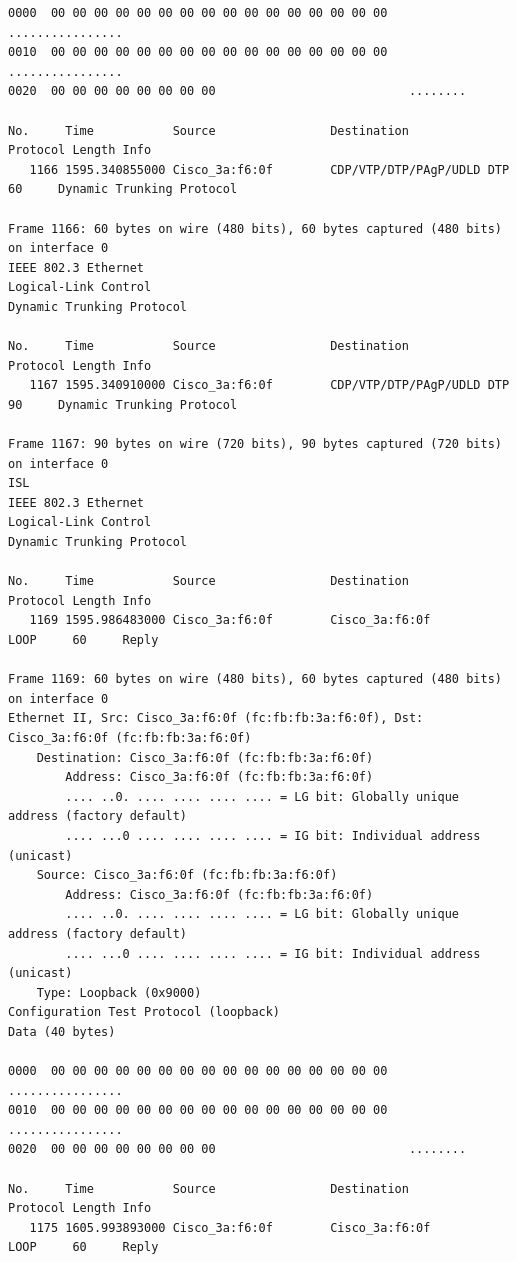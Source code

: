 \documentclass[a4paper,11pt]{article}
\begin{document}
\begin{lstlisting}
0000  00 00 00 00 00 00 00 00 00 00 00 00 00 00 00 00   ................
0010  00 00 00 00 00 00 00 00 00 00 00 00 00 00 00 00   ................
0020  00 00 00 00 00 00 00 00                           ........

No.     Time           Source                Destination           Protocol Length Info
   1166 1595.340855000 Cisco_3a:f6:0f        CDP/VTP/DTP/PAgP/UDLD DTP      60     Dynamic Trunking Protocol

Frame 1166: 60 bytes on wire (480 bits), 60 bytes captured (480 bits) on interface 0
IEEE 802.3 Ethernet 
Logical-Link Control
Dynamic Trunking Protocol

No.     Time           Source                Destination           Protocol Length Info
   1167 1595.340910000 Cisco_3a:f6:0f        CDP/VTP/DTP/PAgP/UDLD DTP      90     Dynamic Trunking Protocol

Frame 1167: 90 bytes on wire (720 bits), 90 bytes captured (720 bits) on interface 0
ISL
IEEE 802.3 Ethernet 
Logical-Link Control
Dynamic Trunking Protocol

No.     Time           Source                Destination           Protocol Length Info
   1169 1595.986483000 Cisco_3a:f6:0f        Cisco_3a:f6:0f        LOOP     60     Reply

Frame 1169: 60 bytes on wire (480 bits), 60 bytes captured (480 bits) on interface 0
Ethernet II, Src: Cisco_3a:f6:0f (fc:fb:fb:3a:f6:0f), Dst: Cisco_3a:f6:0f (fc:fb:fb:3a:f6:0f)
    Destination: Cisco_3a:f6:0f (fc:fb:fb:3a:f6:0f)
        Address: Cisco_3a:f6:0f (fc:fb:fb:3a:f6:0f)
        .... ..0. .... .... .... .... = LG bit: Globally unique address (factory default)
        .... ...0 .... .... .... .... = IG bit: Individual address (unicast)
    Source: Cisco_3a:f6:0f (fc:fb:fb:3a:f6:0f)
        Address: Cisco_3a:f6:0f (fc:fb:fb:3a:f6:0f)
        .... ..0. .... .... .... .... = LG bit: Globally unique address (factory default)
        .... ...0 .... .... .... .... = IG bit: Individual address (unicast)
    Type: Loopback (0x9000)
Configuration Test Protocol (loopback)
Data (40 bytes)

0000  00 00 00 00 00 00 00 00 00 00 00 00 00 00 00 00   ................
0010  00 00 00 00 00 00 00 00 00 00 00 00 00 00 00 00   ................
0020  00 00 00 00 00 00 00 00                           ........

No.     Time           Source                Destination           Protocol Length Info
   1175 1605.993893000 Cisco_3a:f6:0f        Cisco_3a:f6:0f        LOOP     60     Reply


\end{lstlisting}
\end{document}
